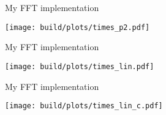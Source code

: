 \begin{frame}{My FFT implementation}
    \begin{center}
        \texttt{[image: build/plots/times\_p2.pdf]}
    \end{center}
\end{frame}
\begin{frame}{My FFT implementation}
    \begin{center}
        \texttt{[image: build/plots/times\_lin.pdf]}
    \end{center}
\end{frame}
\begin{frame}{My FFT implementation}
    \begin{center}
        \texttt{[image: build/plots/times\_lin\_c.pdf]}
    \end{center}
\end{frame}